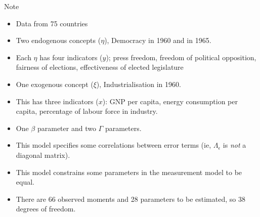\documentclass[10pt,ignorenonframetext,]{beamer}
\providecommand{\tightlist}{%
\setlength{\itemsep}{0pt}\setlength{\parskip}{0pt}}
\begin{document}
\begin{frame}{Note}

\begin{itemize}
\tightlist
\item
  Data from 75 countries
\item
  Two endogenous concepts (\(\eta\)), Democracy in 1960 and in 1965.
\item
  Each \(\eta\) has four indicators (\(y\)); press freedom, freedom of
  political opposition, fairness of elections, effectiveness of elected
  legislature
\item
  One exogenous concept (\(\xi\)), Industrialisation in 1960.
\item
  This has three indicators (\(x\)): GNP per capita, energy consumption
  per capita, percentage of labour force in industry.
\item
  One \(\beta\) parameter and two \(\Gamma\) parameters.
\item
  This model specifies some correlations between error terms (ie,
  \(\Lambda_\epsilon\) is \emph{not} a diagonal matrix).
\item
  This model constrains some parameters in the measurement model to be
  equal.
\item
  There are 66 observed moments and 28 parameters to be estimated, so 38
  degrees of freedom.
\end{itemize}

\end{frame}
\end{document}
